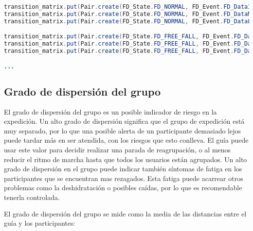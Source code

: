 \begin{lstlisting}[language=java,captionpos=t,caption={\textbf{Máquina de estados que gestiona las transiciones entre estados, a partir de eventos generados.}},label={lst:StateMachine}]
transition_matrix.put(Pair.create(FD_State.FD_NORMAL, FD_Event.FD_DataInsideThreshold), FD_State.FD_NORMAL);
transition_matrix.put(Pair.create(FD_State.FD_NORMAL, FD_Event.FD_DataMoreThreshold), FD_State.FD_NORMAL);
transition_matrix.put(Pair.create(FD_State.FD_NORMAL, FD_Event.FD_DataLessThreshold), FD_State.FD_FREE_FALL);

transition_matrix.put(Pair.create(FD_State.FD_FREE_FALL, FD_Event.FD_DataInsideThreshold), FD_State.FD_NORMAL);
transition_matrix.put(Pair.create(FD_State.FD_FREE_FALL, FD_Event.FD_DataLessThreshold), FD_State.FD_FREE_FALL);
transition_matrix.put(Pair.create(FD_State.FD_FREE_FALL, FD_Event.FD_DataMoreThreshold), FD_State.FD_IMPACT);

...
\end{lstlisting}

\subsection{Grado de dispersión del grupo}

El grado de dispersión del grupo es un posible indicador de riesgo en la expedición. Un alto grado de dispersión significa que el grupo de expedición está muy separado, por lo que una posible alerta de un participante demasiado lejos puede tardar más en ser atendida, con los riesgos que esto conlleva. El guía puede usar este valor para decidir realizar una parada de reagrupación, o al menos reducir el ritmo de marcha hasta que todos los usuarios están agrupados. Un alto grado de dispersión en el grupo puede indicar también síntomas de fatiga en los participantes que se encuentran mas rezagados. Esta fatiga puede acarrear otros problemas como la deshidratación o posibles caídas, por lo que es recomendable tenerla controlada.

El grado de dispersión del grupo se mide como la media de las distancias entre el guía y los participantes:

